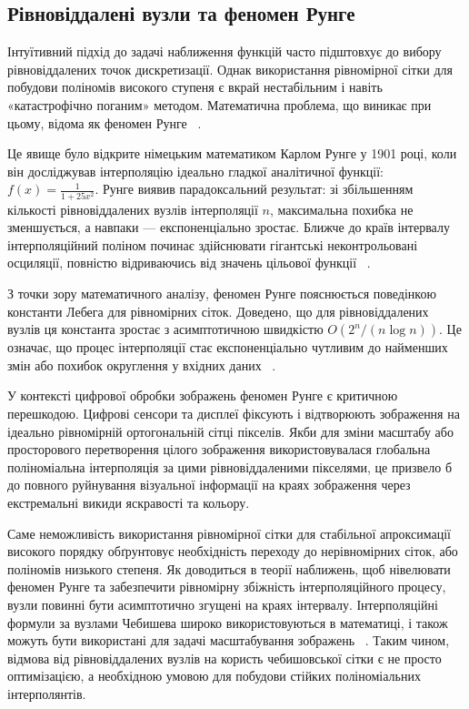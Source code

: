 \subsection{Рівновіддалені вузли та феномен Рунге}

Інтуїтивний підхід до задачі наближення функцій часто підштовхує до вибору рівновіддалених точок дискретизації. Однак використання рівномірної сітки для побудови поліномів високого ступеня є вкрай нестабільним і навіть «катастрофічно поганим» методом. Математична проблема, що виникає при цьому, відома як феномен Рунге ~\cite{trefethen2013approximation}.

Це явище було відкрите німецьким математиком Карлом Рунге у 1901 році, коли він досліджував інтерполяцію ідеально гладкої аналітичної функції: $f(x) = \frac{1}{1 + 25x^2}$. Рунге виявив парадоксальний результат: зі збільшенням кількості рівновіддалених вузлів інтерполяції $n$, максимальна похибка не зменшується, а навпаки — експоненціально зростає. Ближче до країв інтервалу інтерполяційний поліном починає здійснювати гігантські неконтрольовані осциляції, повністю відриваючись від значень цільової функції ~\cite{trefethen2013approximation}. 

З точки зору математичного аналізу, феномен Рунге пояснюється поведінкою константи Лебега для рівномірних сіток. Доведено, що для рівновіддалених вузлів ця константа зростає з асимптотичною швидкістю $O(2^n / (n \log n))$. Це означає, що процес інтерполяції стає експоненціально чутливим до найменших змін або похибок округлення у вхідних даних ~\cite{trefethen2013approximation}.

У контексті цифрової обробки зображень феномен Рунге є критичною перешкодою. Цифрові сенсори та дисплеї фіксують і відтворюють зображення на ідеально рівномірній ортогональній сітці пікселів. Якби для зміни масштабу або просторового перетворення цілого зображення використовувалася глобальна поліноміальна інтерполяція за цими рівновіддаленими пікселями, це призвело б до повного руйнування візуальної інформації на краях зображення через екстремальні викиди яскравості та кольору.

Саме неможливість використання рівномірної сітки для стабільної апроксимації високого порядку обґрунтовує необхідність переходу до нерівномірних сіток, або поліномів низького степеня. Як доводиться в теорії наближень, щоб нівелювати феномен Рунге та забезпечити рівномірну збіжність інтерполяційного процесу, вузли повинні бути асимптотично згущені на краях інтервалу. Інтерполяційні формули за вузлами Чебишева широко використовуються в математиці, і також можуть бути використані для задачі масштабування зображень ~\cite{gavrilyuk2011}\cite{vasylyk2016}. Таким чином, відмова від рівновіддалених вузлів на користь чебишовської сітки є не просто оптимізацією, а необхідною умовою для побудови стійких поліноміальних інтерполянтів.